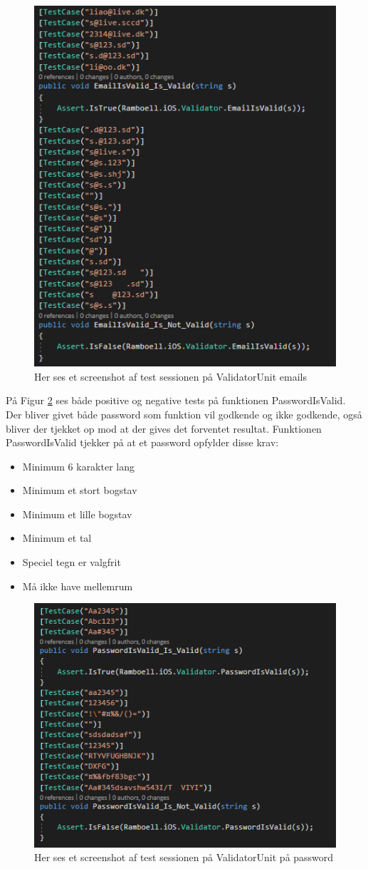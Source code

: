 \begin{figure}[H]
	\centering
	\includegraphics[width=0.6\linewidth]{Unit/ValidatorUnitEmail.PNG}
	\caption{Her ses et screenshot af test sessionen på ValidatorUnit emails}
	\label{fig:ValidatorUnitEmail}
\end{figure}
På Figur \ref{fig:ValidatorUnitPassword} ses både positive og negative tests på funktionen PasswordIsValid. Der bliver givet både password som funktion vil godkende og ikke godkende, også bliver der tjekket op mod at der gives det forventet resultat. Funktionen PasswordIsValid tjekker på at et password opfylder disse krav: \\
\begin{itemize}
	\item Minimum 6 karakter lang
	\item Minimum et stort bogstav
	\item Minimum et lille bogstav
	\item Minimum et tal
	\item Speciel tegn er valgfrit
	\item Må ikke have mellemrum
\end{itemize}

\begin{figure}[H]
	\centering
	\includegraphics[width=0.6\linewidth]{Unit/ValidatorUnitPassword.PNG}
	\caption{Her ses et screenshot af test sessionen på ValidatorUnit på password}
	\label{fig:ValidatorUnitPassword}
\end{figure}


